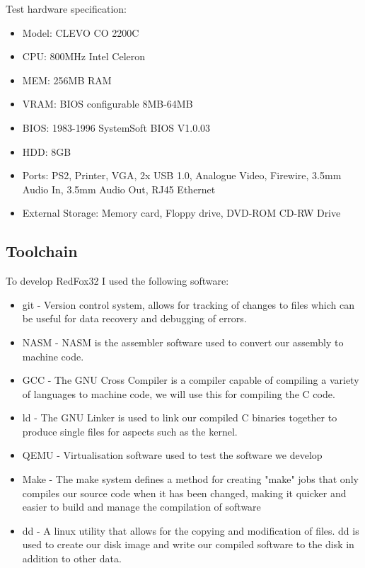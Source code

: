 \documentclass[10pt,a4paper]{article}
\begin{document}
Test hardware specification:
\begin{itemize}
\item Model: CLEVO CO 2200C
\item CPU: 800MHz Intel Celeron
\item MEM: 256MB RAM
\item VRAM: BIOS configurable 8MB-64MB
\item BIOS: 1983-1996 SystemSoft BIOS V1.0.03
\item HDD: 8GB
\item Ports: PS2, Printer, VGA, 2x USB 1.0, Analogue Video, Firewire, 3.5mm Audio In, 3.5mm Audio Out, RJ45 Ethernet
\item External Storage: Memory card, Floppy drive, DVD-ROM CD-RW Drive
\end{itemize}

\newpage

\subsection{Toolchain}
To develop RedFox32 I used the following software:
\begin{itemize}
	\item git - Version control system, allows for tracking of changes to files which can be useful for data recovery and debugging of errors.
	\item NASM - NASM is the assembler software used to convert our assembly to machine code.
	\item GCC - The GNU Cross Compiler is a compiler capable of compiling a variety of languages to machine code, we will use this for compiling the C code.
	\item ld - The GNU Linker is used to link our compiled C binaries together to produce single files for aspects such as the kernel.
	\item QEMU - Virtualisation software used to test the software we develop
	\item Make - The make system defines a method for creating "make" jobs that only compiles our source code when it has been changed, making it quicker and easier to build and manage the compilation of software
	 \item dd - A linux utility that allows for the copying and modification of files. dd is used to create our disk image and write our compiled software to the disk in addition to other data.
\end{itemize}

\newpage
\end{document}

